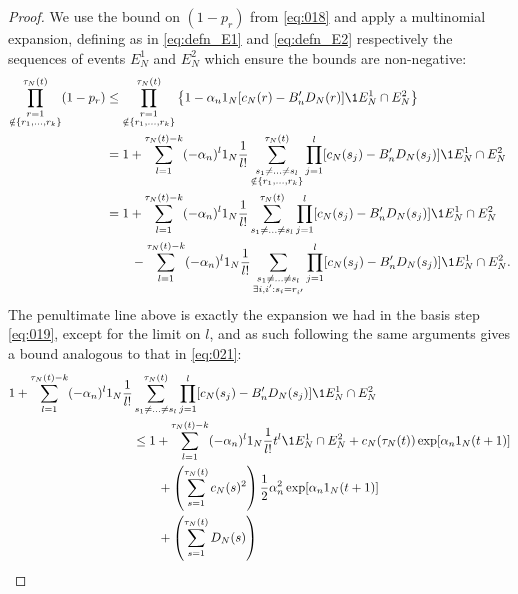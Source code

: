 \begin{proof}
We use the bound on $(1-p_r)$ from \eqref{eq:018} and apply a multinomial expansion, defining as in \eqref{eq:defn_E1} and \eqref{eq:defn_E2} respectively the sequences of events $E_N^1$ and $E_N^2$ which ensure the bounds are non-negative:
\begin{align}
\prod_{\substack{r=1 \\ \notin \{r_1,\dots,r_k\} }}^{\tau_N(t)} (1-p_r)
&\leq \prod_{\substack{r=1 \\ \notin \{r_1,\dots,r_k\} }}^{\tau_N(t)} 
        \left\{ 1 - \alpha_n  \ON [ c_N(r) - B_n^\prime D_N(r) ] 
        \1{E_N^1 \cap E_N^2} \right\} \notag\\
&= 1 + \sum_{l=1}^{\tau_N(t) -k}
        (-\alpha_n)^l \ON \frac{1}{l!}
        \sum_{\substack{s_1\neq\dots\neq s_l \\ \notin \{r_1,\dots,r_k\} }}
        ^{\tau_N(t)}
        \prod_{j=1}^l [ c_N(s_j) - B_n^\prime D_N(s_j) ]
        \1{E_N^1 \cap E_N^2} \notag\\
&= 1 + \sum_{l=1}^{\tau_N(t) -k}
        (-\alpha_n)^l \ON \frac{1}{l!}
        \sum_{\substack{s_1\neq\dots\neq s_l }}^{\tau_N(t)}
        \prod_{j=1}^l [ c_N(s_j) - B_n^\prime D_N(s_j) ] \1{E_N^1 \cap E_N^2} \notag\\
    &\qquad- \sum_{l=1}^{\tau_N(t) -k}
        (-\alpha_n)^l \ON \frac{1}{l!}
        \sum_{\substack{s_1\neq\dots\neq s_l \\ \exists i,i^\prime 
        : s_i=r_{i^\prime} }}
        \prod_{j=1}^l [ c_N(s_j) - B_n^\prime D_N(s_j) ]
        \1{E_N^1 \cap E_N^2} . \label{eq:031}
\end{align}
The penultimate line above is exactly the expansion we had in the basis step \eqref{eq:019}, except for the limit on $l$, and as such following the same arguments gives a bound analogous to that in \eqref{eq:021}:
\begin{align*}
1 + \sum_{l=1}^{\tau_N(t) -k}
        (-\alpha_n)^l \ON \frac{1}{l!}
        &\sum_{\substack{s_1\neq\dots\neq s_l }}^{\tau_N(t)}
        \prod_{j=1}^l [ c_N(s_j) - B_n^\prime D_N(s_j) ] \1{E_N^1 \cap E_N^2} \\
&\leq 1+ \sum_{l=1}^{\tau_N(t) -k} (-\alpha_n)^l \ON \frac{1}{l!} t^l
        \1{E_N^1 \cap E_N^2}
        + c_N(\tau_N(t)) \exp[ \alpha_n \ON (t+1) ] \\
    &\qquad+ \left( \sum_{s=1}^{\tau_N(t)} c_N(s)^2 \right)
        \frac{1}{2} \alpha_n^2 \exp[ \alpha_n \ON (t+1) ] \\
    &\qquad+ \left( \sum_{s=1}^{\tau_N(t)} D_N(s) \right)

\end{align*}
\end{proof}
